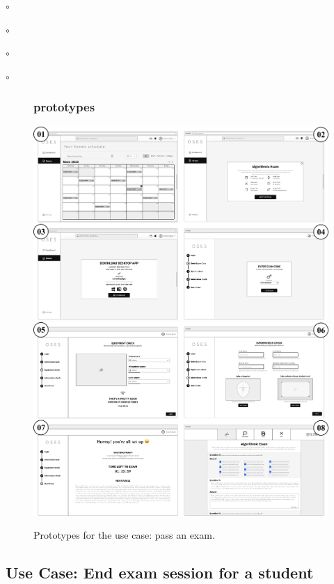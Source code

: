\documentclass[]{uc2pfecaneva}
\begin{document}
\begin{list}{$\circ$}{}
\begin{list}{$\circ$}{}
\begin{list}{$\circ$}{}
\begin{list}{$\circ$}{}
\begin{figure}[h]
        \subsubsection{prototypes}
        \centering
        \includegraphics[width=\textwidth]{images/prototypes_pass_exam1}
        \includegraphics[width=\textwidth]{images/prototypes_pass_exam2}

        \caption{Prototypes for the use case: pass an exam.}
    \end{figure}
    \clearpage



    \thispagestyle{empty}
    \begin{table}[h]
        \raggedright\subsection{Use Case: End exam session for a student}

\end{table}
\end{list}
\end{list}
\end{list}
\end{list}
\end{document}
